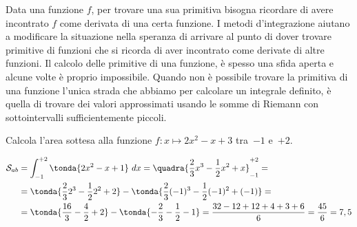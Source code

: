 Data una funzione \(f\), per trovare una sua primitiva bisogna ricordare di 
avere incontrato \(f\) come derivata di una  certa funzione. 
I metodi d'integrazione aiutano a modificare la situazione nella speranza 
di arrivare al punto di dover trovare primitive di funzioni che si ricorda 
di aver incontrato come derivate di altre funzioni. 
Il calcolo delle primitive di una funzione, è spesso una sfida 
aperta e alcune volte è proprio impossibile.
Quando non è possibile trovare la primitiva di una funzione l'unica strada 
che abbiamo per calcolare un integrale definito, è quella di trovare dei 
valori approssimati usando le somme di Riemann con sottointervalli 
sufficientemente piccoli.

\begin{esempio}
Calcola l'area sottesa alla funzione \quad
\(f: x \mapsto 2 x^2 -x +3\) \quad 
tra~\(-1\) e~\(+2\).


\begin{align*}
\mathcal{S}_{ab} &= \int_{-1}^{+2} \tonda{2 x^2 -x +1}~dx = 
   \quadra{\frac{2}{3}x^3 - \frac{1}{2}x^2 + x}_{-1}^{+2} = \\
&= \tonda{\frac{2}{3}2^3 - \frac{1}{2}2^2 + 2} -
     \tonda{\frac{2}{3}(-1)^3 - \frac{1}{2}(-1)^2 +(-1)} = \\
&= \tonda{\frac{16}{3} - \frac{4}{2} + 2} - 
     \tonda{-\frac{2}{3} - \frac{1}{2} -1} = 
   \frac{32 -12 +12 +4 +3 +6}{6} = \frac{45}{6} = 7,5
\end{align*}
\end{esempio}

